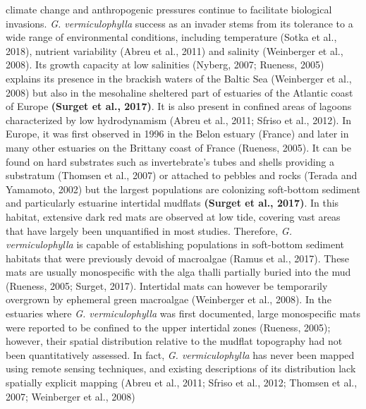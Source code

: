 \documentclass[
  letterpaper,
  DIV=11,
  numbers=noendperiod]{scrartcl}
\begin{document}
climate change and anthropogenic pressures continue to facilitate
biological invasions. \emph{G. vermiculophylla} success as an invader
stems from its tolerance to a wide range of environmental conditions,
including temperature (Sotka et al., 2018), nutrient variability (Abreu
et al., 2011) and salinity (Weinberger et al., 2008). Its growth
capacity at low salinities (Nyberg, 2007; Rueness, 2005) explains its
presence in the brackish waters of the Baltic Sea (Weinberger et al.,
2008) but also in the mesohaline sheltered part of estuaries of the
Atlantic coast of Europe \textbf{(Surget et al., 2017)}. It is also
present in confined areas of lagoons characterized by low hydrodynamism
(Abreu et al., 2011; Sfriso et al., 2012). In Europe, it was first
observed in 1996 in the Belon estuary (France) and later in many other
estuaries on the Brittany coast of France (Rueness, 2005). It can be
found on hard substrates such as invertebrate's tubes and shells
providing a substratum (Thomsen et al., 2007) or attached to pebbles and
rocks (Terada and Yamamoto, 2002) but the largest populations are
colonizing soft-bottom sediment and particularly estuarine intertidal
mudflats \textbf{(Surget et al., 2017)}. In this habitat, extensive dark
red mats are observed at low tide, covering vast areas that have largely
been unquantified in most studies. Therefore, \emph{G. vermiculophylla}
is capable of establishing populations in soft-bottom sediment habitats
that were previously devoid of macroalgae (Ramus et al., 2017). These
mats are usually monospecific with the alga thalli partially buried into
the mud (Rueness, 2005; Surget, 2017). Intertidal mats can however be
temporarily overgrown by ephemeral green macroalgae (Weinberger et al.,
2008). In the estuaries where \emph{G. vermiculophylla} was first
documented, large monospecific mats were reported to be confined to the
upper intertidal zones (Rueness, 2005); however, their spatial
distribution relative to the mudflat topography had not been
quantitatively assessed. In fact, \emph{G. vermiculophylla} has never
been mapped using remote sensing techniques, and existing descriptions
of its distribution lack spatially explicit mapping (Abreu et al., 2011;
Sfriso et al., 2012; Thomsen et al., 2007; Weinberger et al., 2008)
\end{document}
